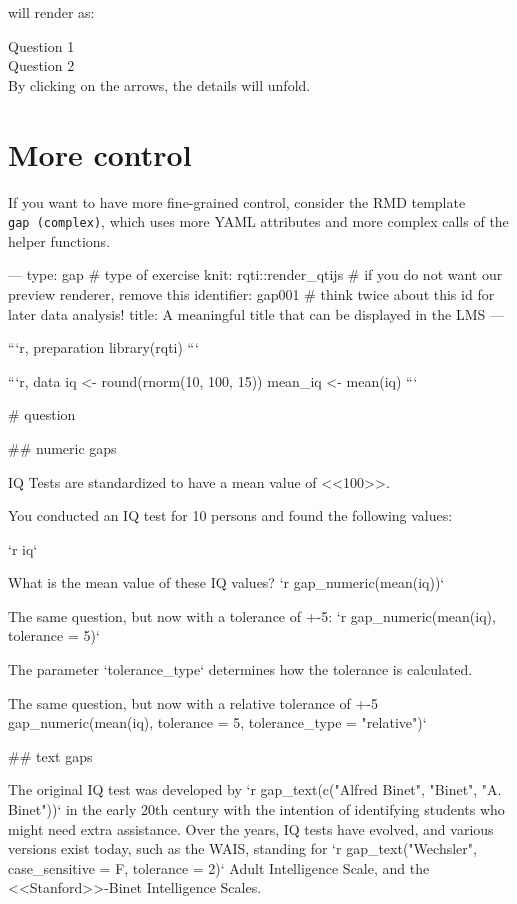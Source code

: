 \documentclass[twoside]{tufte-book}
\newenvironment{Shaded}{}{}
\begin{document}
will render as:

\noindent\textrightarrow{} Question 1\\
\noindent\textrightarrow{} Question 2\\

By clicking on the arrows, the details will unfold.

\section{More control}\label{more-control-2}

If you want to have more fine-grained control, consider the RMD template \texttt{gap\ (complex)}, which uses more YAML attributes and more complex calls of the helper functions.

\begin{Shaded}
\begin{Highlighting}
---
type: gap # type of exercise
knit: rqti::render_qtijs # if you do not want our preview renderer, remove this
identifier: gap001 # think twice about this id for later data analysis!
title: A meaningful title that can be displayed in the LMS
---

```{r, preparation}
library(rqti)
```

```{r, data}
iq <- round(rnorm(10, 100, 15))
mean_iq <- mean(iq)
```

# question

## numeric gaps

IQ Tests are standardized to have a mean value of <<100>>.

You conducted an IQ test for 10 persons and found the following values:

`r iq`

What is the mean value of these IQ values? `r gap_numeric(mean(iq))`

The same question, but now with a tolerance of +-5: `r gap_numeric(mean(iq),
tolerance = 5)`

The parameter `tolerance_type` determines how the tolerance is calculated.

The same question, but now with a relative tolerance of +-5%
gap_numeric(mean(iq), tolerance = 5, tolerance_type = "relative")`

## text gaps

The original IQ test was developed by `r gap_text(c("Alfred Binet", "Binet", "A.
Binet"))` in the early 20th century with the intention of identifying students
who might need extra assistance. Over the years, IQ tests have evolved, and
various versions exist today, such as the WAIS, standing for `r
gap_text("Wechsler", case_sensitive = F, tolerance = 2)` Adult Intelligence
Scale, and the <<Stanford>>-Binet Intelligence Scales.


\end{Highlighting}
\end{Shaded}
\end{document}
